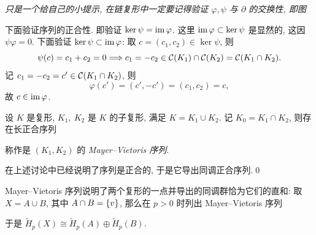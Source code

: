 \textit{只是一个给自己的小提示, 在链复形中一定要记得验证 $ \varphi,\psi $ 与 $ \partial $ 的交换性, 即图}
\begin{center}
\end{center}
下面验证序列的正合性. 即验证 $ \ker\psi=\mathrm{im}\,\varphi $. 这里 $ \mathrm{im}\,\varphi\subset\ker\psi $ 是显然的, 这因 $ \psi\varphi=0 $. 下面验证 $ \ker\psi\subset\mathrm{im}\,\varphi $: 取 $ c=(c_1,c_2)\in\ker\psi $, 则
\[
	\psi(c)=c_1+c_2=0\Longrightarrow c_1=-c_2\in\mathcal{C}(K_1)\cap\mathcal{C}(K_2)=\mathcal{C}(K_1\cap K_2).
\]
记 $ c_1=-c_2=c'\in\mathcal{C}(K_1\cap K_2) $, 则
\[
	\varphi(c')=(c',-c')=(c_1,c_2)=c,
\]
故 $ c\in\mathrm{im}\,\varphi $.

\begin{De-Th}
	设 $ K $ 是复形, $ K_1,\ K_2 $ 是 $ K $ 的子复形, 满足 $ K=K_1\cup K_2 $. 记 $ K_0=K_1\cap K_2 $, 则存在长正合序列
	\begin{center}
	\end{center}
	称作是 $ (K_1,K_2) $ 的 \emph{Mayer--Vietoris 序列}.
\end{De-Th}
\begin{Proof}
	在上述讨论中已经说明了序列是正合的, 于是它导出同调正合序列.\qed
\end{Proof}

Mayer--Vietoris 序列说明了两个复形的一点并导出的同调群恰为它们的直和: 取 $ X=A\cup B $, 其中 $ A\cap B=\left\{ v \right\} $, 那么在 $ p>0 $ 时列出 Mayer--Vietoris 序列
\begin{center}
\end{center}
于是 $ \tilde{H}_p(X)\cong\tilde{H}_p(A)\oplus\tilde{H}_p(B) $.

